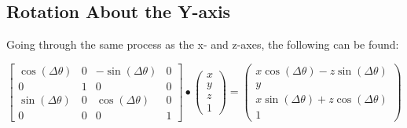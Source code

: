 \documentclass{article}
\begin{document}
	\subsection{Rotation About the Y-axis}
	Going through the same process as the x- and z-axes, the following can be found: \par
	\[
		\begin{bmatrix}
			\cos(\Delta\theta) & 0 & -\sin(\Delta\theta) & 0 \\
			0 & 1 & 0 & 0 \\
			\sin(\Delta\theta) & 0 &  \cos(\Delta\theta) & 0 \\
			0 & 0 & 0 & 1
		\end{bmatrix}
		\bullet
		\begin{pmatrix}
			x \\
			y \\
			z \\
			1
		\end{pmatrix}
		=
		\begin{pmatrix}
			x\cos(\Delta\theta) - z\sin(\Delta\theta) \\
			y \\
			x\sin(\Delta\theta) + z\cos(\Delta\theta) \\
			1
		\end{pmatrix}
	\]
\end{document}
